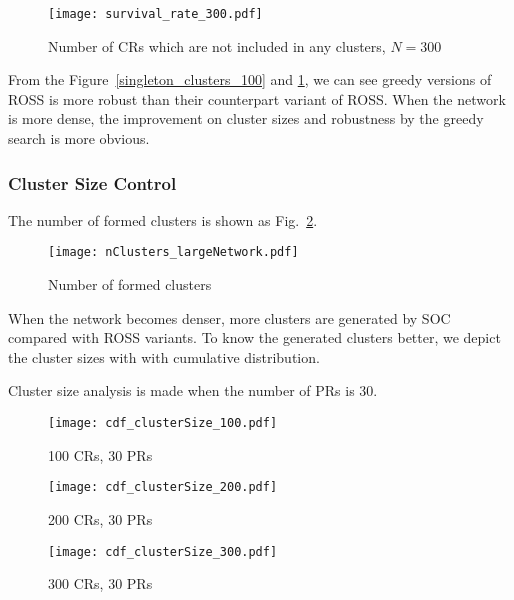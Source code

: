 \begin{figure}[h!]
  \centering
   \texttt{[image: survival\_rate\_300.pdf]}
  \caption{Number of CRs which are not included in any clusters, $N=300$}
  \label{singleton_clusters_300}
\end{figure}

From the Figure~\ref{singleton_clusters_100} and \ref{singleton_clusters_300}, we can see greedy versions of ROSS is more robust than their counterpart variant of ROSS.
When the network is more dense, the improvement on cluster sizes and robustness by the greedy search is more obvious.


\subsubsection{Cluster Size Control}

The number of formed clusters is shown as Fig.~\ref{nClusters_largeNetwork}.

\begin{figure}[h!]
  \centering
   \texttt{[image: nClusters\_largeNetwork.pdf]}
  \caption{Number of formed clusters}
  \label{nClusters_largeNetwork}
\end{figure}
When the network becomes denser, more clusters are generated by SOC compared with ROSS variants.
To know the generated clusters better, we depict the cluster sizes with with cumulative distribution.

Cluster size analysis is made when the number of PRs is 30.


\begin{figure}[h!]
  \centering
   \texttt{[image: cdf\_clusterSize\_100.pdf]}
  \caption{100 CRs, 30 PRs}
  \label{cdf_clusterSize_100}
\end{figure}

\begin{figure}[h!]
  \centering
   \texttt{[image: cdf\_clusterSize\_200.pdf]}
  \caption{200 CRs, 30 PRs}
  \label{cdf_clusterSize_200}
\end{figure}


\begin{figure}[h!]
  \centering
   \texttt{[image: cdf\_clusterSize\_300.pdf]}
  \caption{300 CRs, 30 PRs}
  \label{cdf_clusterSize_300}
\end{figure}


